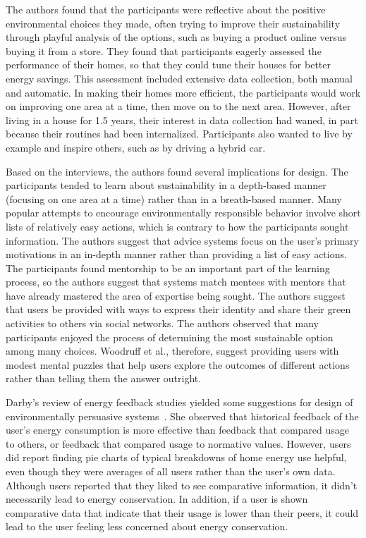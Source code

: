 The authors found that the participants were reflective about the positive environmental choices they made, often trying to improve their sustainability through playful analysis of the options, such as buying a product online versus buying it from a store. They found that participants eagerly assessed the performance of their homes, so that they could tune their houses for better energy savings. This assessment included extensive data collection, both manual and automatic. In making their homes more efficient, the participants would work on improving one area at a time, then move on to the next area. However, after living in a house for 1.5 years, their interest in data collection had waned, in part because their routines had been internalized. Participants also wanted to live by example and inspire others, such as by driving a hybrid car.

Based on the interviews, the authors found several implications for design. The participants tended to learn about sustainability in a depth-based manner (focusing on one area at a time) rather than in a breath-based manner. Many popular attempts to encourage environmentally responsible behavior involve short lists of relatively easy actions, which is contrary to how the participants sought information. The authors suggest that advice systems focus on the user's primary motivations in an in-depth manner rather than providing a list of easy actions. The participants found mentorship to be an important part of the learning process, so the authors suggest that systems match mentees with mentors that have already mastered the area of expertise being sought. The authors suggest that users be provided with ways to express their identity and share their green activities to others via social networks. The authors observed that many participants enjoyed the process of determining the most sustainable option among many choices. Woodruff et al., therefore, suggest providing users with modest mental puzzles that help users explore the outcomes of different actions rather than telling them the answer outright.

Darby's review of energy feedback studies yielded some suggestions for design of environmentally persuasive systems~\cite{darby-review-2006}. She observed that historical feedback of the user's energy consumption is more effective than feedback that compared usage to others, or feedback that compared usage to normative values. However, users did report finding pie charts of typical breakdowns of home energy use helpful, even though they were averages of all users rather than the user's own data. Although users reported that they liked to see comparative information, it didn't necessarily lead to energy conservation. In addition, if a user is shown comparative data that indicate that their usage is lower than their peers, it could lead to the user feeling less concerned about energy conservation.

